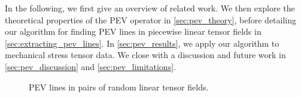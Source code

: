 %
In the following, we first give an overview of related work.
%
We then explore the theoretical properties of the \ac{PEV} operator in
\cref{sec:pev_theory}, before detailing our algorithm for finding \ac{PEV} lines
in piecewise linear tensor fields in \cref{sec:extracting_pev_lines}.
%
In \cref{sec:pev_results}, we apply our algorithm to mechanical stress tensor
data.
%
We close with a discussion and future work in \cref{sec:pev_discussion} and
\cref{sec:pev_limitations}.
%
\begin{figure}[t]
    \centering
    
    \caption{\ac{PEV} lines in pairs of random linear tensor fields.}
    \label{fig:rand_lines}
\end{figure}
%
%
